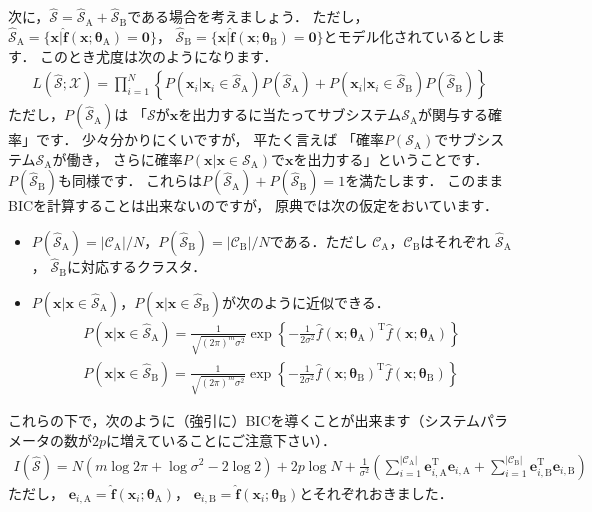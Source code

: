﻿\documentclass{jsarticle}
\begin{document}
次に，$\hat{\mathcal{S}}=\hat{\mathcal{S}}_{\mathrm{A}}+\hat{\mathcal{S}}_{\mathrm{B}}$である場合を考えましょう．
ただし，$\hat{\mathcal{S}}_{\mathrm{A}}=\{\bm{x}|\hat{\bm{f}}(\bm{x};\bm{\theta}_{\mathrm{A}})=\bm{0}\}$，
$\hat{\mathcal{S}}_{\mathrm{B}}=\{\bm{x}|\hat{\bm{f}}(\bm{x};\bm{\theta}_{\mathrm{B}})=\bm{0}\}$とモデル化されているとします．
このとき尤度は次のようになります．
\begin{align*}
L(\hat{\mathcal{S}};\mathcal{X})
=\prod_{i=1}^{N}\left\{
 P(\bm{x}_{i}|\bm{x}_{i}\in\hat{\mathcal{S}}_{\mathrm{A}})P(\hat{\mathcal{S}}_{\mathrm{A}})
+P(\bm{x}_{i}|\bm{x}_{i}\in\hat{\mathcal{S}}_{\mathrm{B}})P(\hat{\mathcal{S}}_{\mathrm{B}})\right\}
\end{align*}
ただし，$P(\hat{\mathcal{S}}_{\mathrm{A}})$は
「$\mathcal{S}$が$\bm{x}$を出力するに当たってサブシステム$\mathcal{S}_{\mathrm{A}}$が関与する確率」です．
少々分かりにくいですが，
平たく言えば
「確率$P(\mathcal{S}_{\mathrm{A}})$でサブシステム$\mathcal{S}_{\mathrm{A}}$が働き，
さらに確率$P(\bm{x}|\bm{x}\in\mathcal{S}_{\mathrm{A}})$で$\bm{x}$を出力する」ということです．
$P(\hat{\mathcal{S}}_{\mathrm{B}})$も同様です．
これらは$P(\hat{\mathcal{S}}_{\mathrm{A}})+P(\hat{\mathcal{S}}_{\mathrm{B}})=1$を満たします．
このままBICを計算することは出来ないのですが，
原典では次の仮定をおいています．
\begin{itemize}
\item{$P(\hat{\mathcal{S}}_{\mathrm{A}})=|\mathcal{C}_{\mathrm{A}}|/N$，$P(\hat{\mathcal{S}}_{\mathrm{B}})=|\mathcal{C}_{\mathrm{B}}|/N$である．ただし
$\mathcal{C}_{\mathrm{A}}$，$\mathcal{C}_{\mathrm{B}}$はそれぞれ
$\hat{\mathcal{S}}_{\mathrm{A}}$，
$\hat{\mathcal{S}}_{\mathrm{B}}$に対応するクラスタ．
}
\item{$P(\bm{x}|\bm{x}\in\hat{\mathcal{S}}_{\mathrm{A}})$，$P(\bm{x}|\bm{x}\in\hat{\mathcal{S}}_{\mathrm{B}})$が次のように近似できる．
\begin{align*}
P(\bm{x}|\bm{x}\in\hat{\mathcal{S}}_{\mathrm{A}})
=\frac{1}{\sqrt{(2\pi)^{m}\sigma^{2}}}\exp\left\{-\frac{1}{2\sigma^{2}}
\hat{f}(\bm{x};\bm{\theta}_{\mathrm{A}})^{\mathrm{T}}\hat{f}(\bm{x};\bm{\theta}_{\mathrm{A}})
\right\}
\\
P(\bm{x}|\bm{x}\in\hat{\mathcal{S}}_{\mathrm{B}})
=\frac{1}{\sqrt{(2\pi)^{m}\sigma^{2}}}\exp\left\{-\frac{1}{2\sigma^{2}}
\hat{f}(\bm{x};\bm{\theta}_{\mathrm{B}})^{\mathrm{T}}\hat{f}(\bm{x};\bm{\theta}_{\mathrm{B}})
\right\}
\end{align*}
}
\end{itemize}
これらの下で，次のように（強引に）BICを導くことが出来ます（システムパラメータの数が$2p$に増えていることにご注意下さい）．
\begin{align*}
I(\hat{\mathcal{S}})
=
N(m\log2\pi+\log\sigma^{2}-2\log 2)
+2p\log N
+\frac{1}{\sigma^{2}}\left(
 \sum_{i=1}^{|\mathcal{C}_{\mathrm{A}}|}\bm{e}_{i,\mathrm{A}}^{\mathrm{T}}\bm{e}_{i,\mathrm{A}}
+\sum_{i=1}^{|\mathcal{C}_{\mathrm{B}}|}\bm{e}_{i,\mathrm{B}}^{\mathrm{T}}\bm{e}_{i,\mathrm{B}}
\right)
\end{align*}
ただし，
$\bm{e}_{i,\mathrm{A}}=\hat{\bm{f}}(\bm{x}_{i};\bm{\theta}_{\mathrm{A}})$，
$\bm{e}_{i,\mathrm{B}}=\hat{\bm{f}}(\bm{x}_{i};\bm{\theta}_{\mathrm{B}})$とそれぞれおきました．
\end{document}
